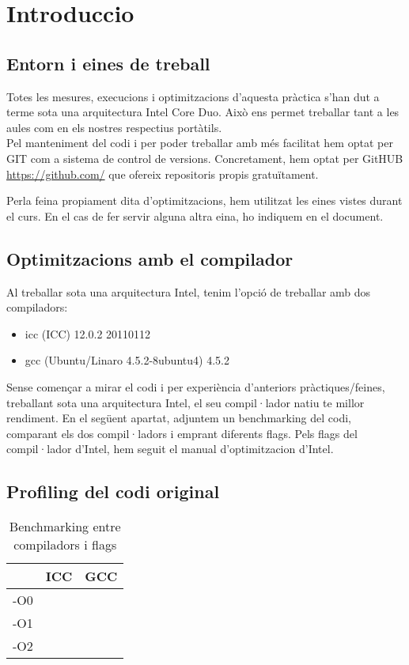 \chapter{Introduccio}

\section{Entorn i eines de treball}
Totes les mesures, execucions i optimitzacions d'aquesta pràctica s'han dut a terme sota una arquitectura Intel Core Duo. Això ens permet treballar tant a les aules com en els nostres respectius portàtils.\\

Pel manteniment del codi i per poder treballar amb més facilitat hem optat per GIT com a sistema de control de versions. Concretament, hem optat per GitHUB \url{https://github.com/} que ofereix repositoris propis gratuïtament.

Perla feina propiament dita d'optimitzacions, hem utilitzat les eines vistes durant el curs. En el cas de fer servir alguna altra eina, ho indiquem en el document.

\section{Optimitzacions amb el compilador}
Al treballar sota una arquitectura Intel, tenim l'opció de treballar amb dos compiladors:

\begin{itemize}
  \item icc (ICC) 12.0.2 20110112
  \item gcc (Ubuntu/Linaro 4.5.2-8ubuntu4) 4.5.2
\end{itemize}

Sense començar a mirar el codi i per experiència d'anteriors pràctiques/feines, treballant sota una arquitectura Intel, el seu compil·lador natiu te millor rendiment. En el següent apartat, adjuntem un benchmarking del codi, comparant els dos compil·ladors i emprant diferents flags. Pels flags del compil·lador d'Intel, hem seguit el manual d'optimitzacion d'Intel.

\section{Profiling del codi original}


\begin{table}[h!b!p!]
\caption{Benchmarking entre compiladors i flags}
\begin{center}
\begin{tabular}{lll}
\hline
 & ICC & GCC \\
\hline
-O0 &  &  \\
-O1 &  &  \\
-O2 &  &  \\
\hline
\end{tabular}
\end{center}
\label{table1}
\end{table}

